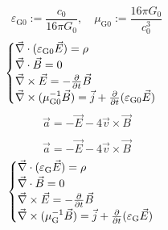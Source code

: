 \begin{equation}
    \varepsilon_{\text{G}0}:=\frac{c_0}{16\pi G_0},\quad
    \mu_{\text{G}0}:=\frac{16\pi G_0}{c_0^3}
\end{equation}
\begin{equation}
    \begin{cases}
        \vec{\nabla}\cdot(\varepsilon_{\text{G}0}\vec{E})=\rho\\
        \vec{\nabla}\cdot\vec{B}=0\\
        \vec{\nabla}\times\vec{E}=-\frac{\partial}{\partial t}\vec{B}\\
        \vec{\nabla}\times(\mu_{\text{G}0}^{-1}\vec{B})=\vec{j}+\frac{\partial}{\partial t}(\varepsilon_{\text{G}0}\vec{E})
    \end{cases}
\end{equation}
\begin{equation}
    \vec{a}=-\vec{E}-4\vec{v}\times\vec{B}
\end{equation}

\begin{equation}
    \vec{a}=-\vec{E}-4\vec{v}\times\vec{B}
\end{equation}
\begin{equation}
    \begin{cases}
        \vec{\nabla}\cdot(\varepsilon_{\text{G}}\vec{E})=\rho\\
        \vec{\nabla}\cdot\vec{B}=0\\
        \vec{\nabla}\times\vec{E}=-\frac{\partial}{\partial t}\vec{B}\\
        \vec{\nabla}\times(\mu_{\text{G}}^{-1}\vec{B})=\vec{j}+\frac{\partial}{\partial t}(\varepsilon_{\text{G}}\vec{E})
    \end{cases}
\end{equation}


